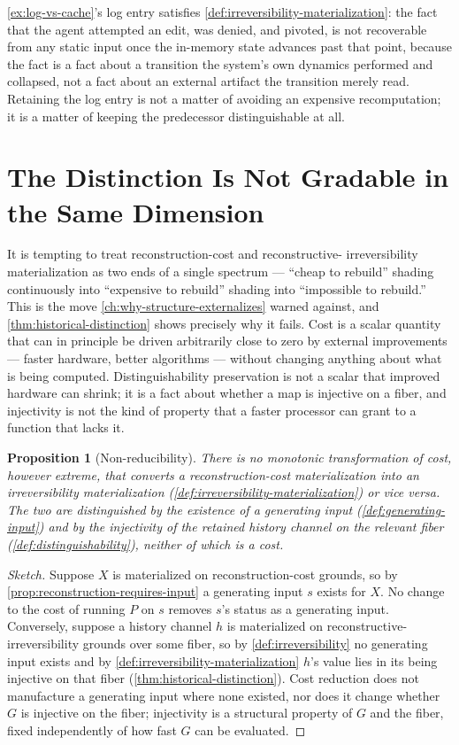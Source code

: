 \documentclass[11pt]{book}
\theoremstyle{plain}
\newtheorem{proposition}[theorem]{Proposition}
\theoremstyle{definition}
\theoremstyle{remark}
\begin{document}
\cref{ex:log-vs-cache}'s log entry satisfies
\cref{def:irreversibility-materialization}: the fact that the agent
attempted an edit, was denied, and pivoted, is not recoverable from any
static input once the in-memory state advances past that point,
because the fact is a fact about a transition the system's own
dynamics performed and collapsed, not a fact about an external artifact
the transition merely read. Retaining the log entry is not a matter of
avoiding an expensive recomputation; it is a matter of keeping the
predecessor distinguishable at all.

\section{The Distinction Is Not Gradable in the Same Dimension}

It is tempting to treat reconstruction-cost and reconstructive-
irreversibility materialization as two ends of a single spectrum ---
\enquote{cheap to rebuild} shading continuously into \enquote{expensive
to rebuild} shading into \enquote{impossible to rebuild.} This is the
move \cref{ch:why-structure-externalizes} warned against, and
\cref{thm:historical-distinction} shows precisely why it fails. Cost is
a scalar quantity that can in principle be driven arbitrarily close to
zero by external improvements --- faster hardware, better algorithms
--- without changing anything about what is being computed.
Distinguishability preservation is not a scalar that improved hardware
can shrink; it is a fact about whether a map is injective on a fiber,
and injectivity is not the kind of property that a faster processor
can grant to a function that lacks it.

\begin{proposition}[Non-reducibility]
\label{prop:non-reducibility}
There is no monotonic transformation of cost, however extreme, that
converts a reconstruction-cost materialization into an irreversibility
materialization (\cref{def:irreversibility-materialization}) or vice
versa. The two are distinguished by the existence of a generating input
(\cref{def:generating-input}) and by the injectivity of the retained
history channel on the relevant fiber (\cref{def:distinguishability}),
neither of which is a cost.
\end{proposition}

\begin{proof}[Sketch]
Suppose $X$ is materialized on reconstruction-cost grounds, so by
\cref{prop:reconstruction-requires-input} a generating input $s$ exists
for $X$. No change to the cost of running $P$ on $s$ removes $s$'s
status as a generating input. Conversely, suppose a history channel $h$
is materialized on reconstructive-irreversibility grounds over some
fiber, so by \cref{def:irreversibility} no generating input exists and
by \cref{def:irreversibility-materialization} $h$'s value lies in its
being injective on that fiber (\cref{thm:historical-distinction}).
Cost reduction does not manufacture a generating input where none
existed, nor does it change whether $G$ is injective on the fiber;
injectivity is a structural property of $G$ and the fiber, fixed
independently of how fast $G$ can be evaluated.
\end{proof}
\end{document}
